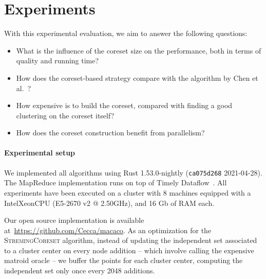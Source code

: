 \section{Experiments}

\newcommand{\mc}[1]{{\color{red} --- MC: #1 ---}}

\graphicspath{{../imgs/}}

\newcommand{\data}[1]{\texttt{#1}}
\newcommand{\higgs}{\texttt{Higgs}\xspace}
\newcommand{\phones}{\texttt{Phones}\xspace}
\newcommand{\wiki}{\texttt{Wiki}\xspace}
\newcommand{\chen}{\textsc{ChenEtAl}\xspace}
\newcommand{\seq}{\textsc{SeqCoreset}\xspace}
\newcommand{\stream}{\textsc{StremingCoreset}\xspace}
\newcommand{\mapr}{\textsc{MRCoreset}\xspace}

With this experimental evaluation, we aim to answer the following questions:
\begin{itemize}
    \item What is the influence of the coreset size on the performance, 
        both in terms of quality and running time?
    \item How does the coreset-based strategy compare with the algorithm 
        by Chen et al.~\cite{DBLP:journals/algorithmica/ChenLLW16}?
    \item How expensive is to build the coreset, compared with finding
        a good clustering on the coreset itself?
    \item How does the coreset construction benefit from parallelism?
\end{itemize}

\paragraph*{Experimental setup}
We implemented all algorithms using Rust 1.53.0-nightly (\texttt{ca075d268} 2021-04-28).
The MapReduce implementation runs on top of Timely Dataflow~\cite{DBLP:journals/cacm/MurrayMIIBA16}.
All experiments have been executed on a cluster with 8 machines equipped
with a Intel\textregistered Xeon\textregistered CPU (E5-2670 v2 @ 2.50GHz), and 16 Gb of RAM each.

Our open source implementation is available at~\url{https://github.com/Cecca/macaco}.
As an optimization for the \stream algorithm, instead of updating the independent set associated to a cluster center on every node addition
-- which involve calling the expensive matroid oracle -- we buffer the points for each cluster center,
computing the independent set only once every 2048 additions.

